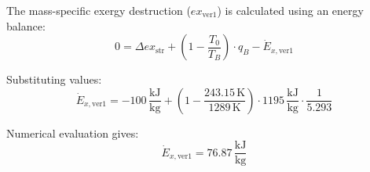 The mass-specific exergy destruction (\( ex_{\text{ver1}} \)) is calculated using an energy balance:  
\[
0 = \Delta ex_{\text{str}} + \left( 1 - \frac{T_0}{T_B} \right) \cdot q_B - \dot{E}_{x,\text{ver1}}
\]  

Substituting values:  
\[
\dot{E}_{x,\text{ver1}} = -100 \, \frac{\text{kJ}}{\text{kg}} + \left( 1 - \frac{243.15 \, \text{K}}{1289 \, \text{K}} \right) \cdot 1195 \, \frac{\text{kJ}}{\text{kg}} \cdot \frac{1}{5.293}
\]  

Numerical evaluation gives:  
\[
\dot{E}_{x,\text{ver1}} = 76.87 \, \frac{\text{kJ}}{\text{kg}}
\]